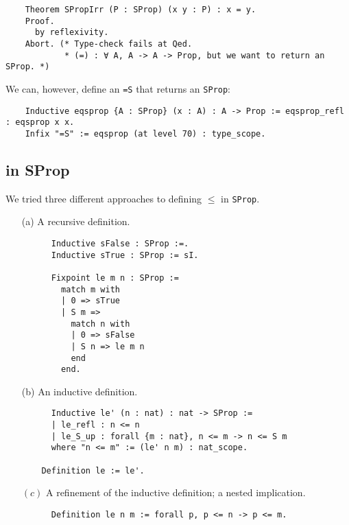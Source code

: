 \documentclass[10pt]{art}
\renewcommand{\c}{\ensuremath{(c)}}
\begin{document}
\begin{listing}[H]
  \begin{verbatim}
    Theorem SPropIrr (P : SProp) (x y : P) : x = y.
    Proof.
      by reflexivity.
    Abort. (* Type-check fails at Qed.
            * (=) : ∀ A, A -> A -> Prop, but we want to return an SProp. *)
  \end{verbatim}
\end{listing}

We can, however, define an \texttt{=S} that returns an \texttt{SProp}:

\begin{listing}[H]
  \begin{verbatim}
    Inductive eqsprop {A : SProp} (x : A) : A -> Prop := eqsprop_refl : eqsprop x x.
    Infix "=S" := eqsprop (at level 70) : type_scope.
  \end{verbatim}
\end{listing}

\subsection{\texorpdfstring{\leq}{<=} in SProp}
We tried three different approaches to defining $\leq$ in \texttt{SProp}.

\begin{enumerate}
  \item[(a)] A recursive definition.
    \begin{listing}[H]
      \begin{verbatim}
      Inductive sFalse : SProp :=.
      Inductive sTrue : SProp := sI.

      Fixpoint le m n : SProp :=
        match m with
        | 0 => sTrue
        | S m =>
          match n with
          | 0 => sFalse
          | S n => le m n
          end
        end.
     \end{verbatim}
    \end{listing}
  \item[(b)] An inductive definition.
    \begin{listing}[H]
      \begin{verbatim}
      Inductive le' (n : nat) : nat -> SProp :=
      | le_refl : n <= n
      | le_S_up : forall {m : nat}, n <= m -> n <= S m
      where "n <= m" := (le' n m) : nat_scope.

    Definition le := le'.
    \end{verbatim}
    \end{listing}
  \item[\c] A refinement of the inductive definition; a nested implication.
    \begin{listing}[H]
      \begin{verbatim}
      Definition le n m := forall p, p <= n -> p <= m.
      \end{verbatim}
    \end{listing}
\end{enumerate}
\end{document}
